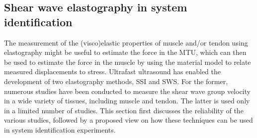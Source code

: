 \subsection{Shear wave elastography in system identification}
The measurement of the (visco)elastic properties of muscle and/or tendon using elastography might be useful to estimate the force in the MTU, which can then be used to estimate the force in the muscle by using the material model to relate measured displacements to stress. Ultrafast ultrasound has enabled the development of two elastography methods, SSI and SWS. For the former, numerous studies have been conducted to measure the shear wave group velocity in a wide variety of tissues, including muscle and tendon. The latter is used only in a limited number of studies. This section first discusses the reliability of the various studies, followed by a proposed view on how these techniques can be used in system identification experiments. 

